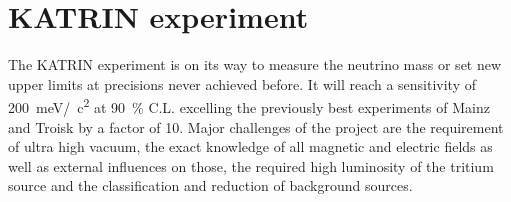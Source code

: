 %

    \chapter{KATRIN experiment}
    \label{ch:The KATRIN experiment}
    The KATRIN experiment is on its way to measure the neutrino mass or set new upper limits at precisions never achieved before. It will reach a sensitivity of \SI{200}{\milli\electronvolt}/\SI{}{\square c} at \SI{90}{\percent} C.L. excelling the previously best experiments of Mainz and Troisk by a factor of \SI{10}{}. Major challenges of the project are the requirement of ultra high vacuum, the exact knowledge of all magnetic and electric fields as well as external influences on those, the required high luminosity of the tritium source and the classification and reduction of background sources.
    
